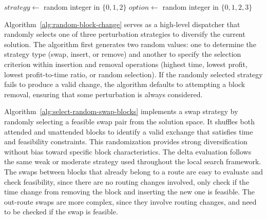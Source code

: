 \begin{algorithm}[h!]
	\caption{Random Block Change} \label{alg:random-block-change}
	\SetAlgoLined

	$strategy \leftarrow$ random integer in $\{0, 1, 2\}$\;
	$option \leftarrow$ random integer in $\{0, 1, 2, 3\}$\;
	\If{$\Delta \neq \emptyset$}{
		\Return{$\Delta$}\;
	}
	\;
\end{algorithm}

Algorithm~\ref{alg:random-block-change} serves as a high-level dispatcher that randomly selects one of three perturbation strategies to diversify the current solution. The algorithm first generates two random values: one to determine the strategy type (swap, insert, or remove) and another to specify the selection criterion within insertion and removal operations (highest time, lowest profit, lowest profit-to-time ratio, or random selection). If the randomly selected strategy fails to produce a valid change, the algorithm defaults to attempting a block removal, ensuring that some perturbation is always considered.

Algorithm~\ref{alg:select-random-swap-blocks} implements a swap strategy by randomly selecting a feasible swap pair from the solution space. It shuffles both attended and unattended blocks to identify a valid exchange that satisfies time and feasibility constraints. This randomization provides strong diversification without bias toward specific block characteristics. The delta evaluation follows the same weak or moderate strategy used throughout the local search framework. The swaps between blocks that already belong to a route are easy to evaluate and check feasibility, since there are no routing changes involved, only check if the time change from removing the block and inserting the new one is feasible. The out-route swaps are more complex, since they involve routing changes, and need to be checked if the swap is feasible.

